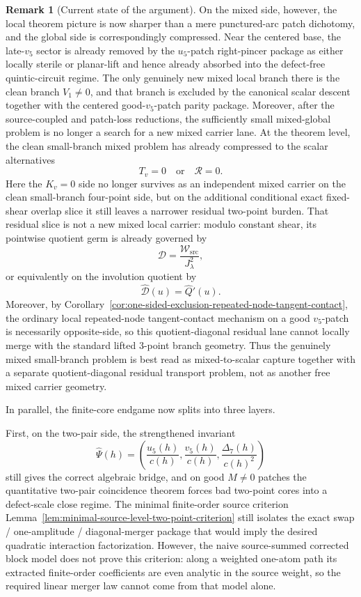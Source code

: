 \documentclass[11pt,a4paper]{amsart}
\theoremstyle{plain}
\theoremstyle{definition}
\newtheorem{remark}[theorem]{Remark}
\begin{document}
\begin{remark}[Current state of the argument]
On the mixed side, however, the local theorem picture is now sharper than a
mere punctured-arc patch dichotomy, and the global side is correspondingly
compressed. Near the centered base, the late-$v_5$
sector is already removed by the $u_5$-patch right-pincer package as either
locally sterile or planar-lift and hence already absorbed into the
defect-free quintic-circuit regime. The only genuinely new mixed local branch
there is the clean branch $V_1\neq 0$, and that branch is excluded by the
canonical scalar descent together with the centered good-$v_5$-patch parity
package. Moreover, after the source-coupled and patch-loss reductions, the
sufficiently small mixed-global problem is no longer a search for a new mixed
carrier lane. At the theorem level, the clean small-branch mixed problem has
already compressed to the scalar alternatives
\[
T_v=0
\quad\text{or}\quad
\mathcal R=0.
\]
Here the $K_v=0$ side no longer survives as an independent mixed carrier on the
clean small-branch four-point side, but on the additional conditional exact
fixed-shear overlap slice it still leaves a narrower residual two-point burden.
That residual slice is not a new mixed local carrier: modulo constant shear,
its pointwise quotient germ is already governed by
\[
\mathcal D=\frac{\mathcal W_{\mathrm{src}}}{J_\lambda^2},
\]
or equivalently on the involution quotient by
\[
\widehat{\mathcal D}(u)=\widehat Q'(u).
\]
Moreover, by
Corollary~\ref{cor:one-sided-exclusion-repeated-node-tangent-contact},
the ordinary local repeated-node tangent-contact mechanism on a good
$v_5$-patch is necessarily opposite-side, so this quotient-diagonal residual
lane cannot locally merge with the standard lifted $3$-point branch geometry.
Thus the genuinely mixed small-branch problem is best read as mixed-to-scalar
capture together with a separate quotient-diagonal residual transport problem,
not as another free mixed carrier geometry.

In parallel, the finite-core endgame now splits into three layers.

First, on the two-pair side, the strengthened invariant
\[
\widehat\Psi(h)=
\left(
\frac{u_5(h)}{c(h)},
\frac{v_5(h)}{c(h)},
\frac{\Delta_7(h)}{c(h)^2}
\right)
\]
still gives the correct algebraic bridge, and on good $M\neq 0$ patches the
quantitative two-pair coincidence theorem forces bad two-point cores into a
defect-scale close regime. The minimal finite-order source criterion
Lemma~\ref{lem:minimal-source-level-two-point-criterion} still isolates the
exact swap / one-amplitude / diagonal-merger package that would imply the
desired quadratic interaction factorization. However, the naive source-summed
corrected block model does not prove this criterion: along a weighted one-atom
path its extracted finite-order coefficients are even analytic in the source
weight, so the required linear merger law cannot come from that model alone.


\end{remark}
\end{document}

